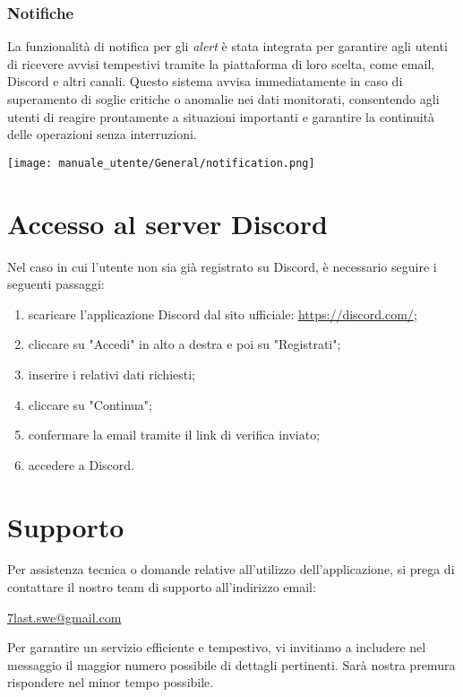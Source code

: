 \subsubsection{Notifiche}
La funzionalità di notifica per gli \textit{alert} è stata integrata per garantire agli utenti di ricevere avvisi tempestivi tramite la piattaforma di loro scelta, come email, Discord e altri canali. Questo sistema avvisa immediatamente in caso di superamento di soglie critiche o anomalie nei dati monitorati, consentendo agli utenti di reagire prontamente a situazioni importanti e garantire la continuità delle operazioni senza interruzioni.
\begin{center}
    \texttt{[image: manuale\_utente/General/notification.png]}
\end{center} 

\newpage
\section{Accesso al server Discord}
Nel caso in cui l'utente non sia già registrato su Discord, è necessario seguire i seguenti passaggi:
\begin{enumerate}
    \item scaricare l'applicazione Discord dal sito ufficiale: \url{https://discord.com/};
    \item cliccare su "Accedi" in alto a destra e poi su "Registrati";
    \item inserire i relativi dati richiesti;
    \item cliccare su "Continua";
    \item confermare la email tramite il link di verifica inviato;
    \item accedere a Discord.
\end{enumerate}

\section{Supporto}
Per assistenza tecnica o domande relative all’utilizzo dell’applicazione, si prega di contattare il nostro team di supporto all'indirizzo email: 
\begin{center}
    \href{mailto:7last.swe@gmail.com}{7last.swe@gmail.com}
\end{center} 
Per garantire un servizio efficiente e tempestivo, vi invitiamo a includere nel messaggio il maggior numero possibile di dettagli pertinenti. Sarà nostra premura rispondere nel minor tempo possibile.